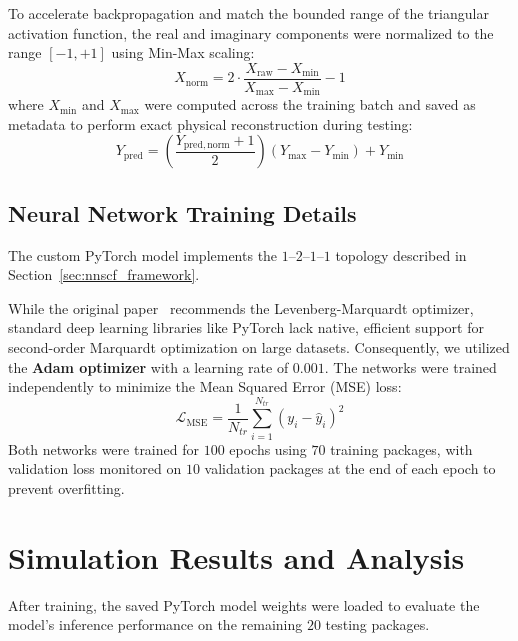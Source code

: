 To accelerate backpropagation and match the bounded range of the triangular activation function, the real and imaginary components were normalized to the range $[-1, +1]$ using Min-Max scaling:
\begin{equation*}
    X_{\mathrm{norm}} = 2 \cdot \frac{X_{\mathrm{raw}} - X_{\mathrm{min}}}{X_{\mathrm{max}} - X_{\mathrm{min}}} - 1
\end{equation*}
where $X_{\mathrm{min}}$ and $X_{\mathrm{max}}$ were computed across the training batch and saved as metadata to perform exact physical reconstruction during testing:
\begin{equation*}
    Y_{\mathrm{pred}} = \left(\frac{Y_{\mathrm{pred, norm}} + 1}{2}\right)(Y_{\mathrm{max}} - Y_{\mathrm{min}}) + Y_{\mathrm{min}}
\end{equation*}

\subsection{Neural Network Training Details}

The custom PyTorch model implements the $1\text{--}2\text{--}1\text{--}1$ topology described in Section~\ref{sec:nnscf_framework}.

While the original paper~\cite{sohn2015neural} recommends the Levenberg-Marquardt optimizer, standard deep learning libraries like PyTorch lack native, efficient support for second-order Marquardt optimization on large datasets. Consequently, we utilized the \textbf{Adam optimizer} with a learning rate of $0.001$. The networks were trained independently to minimize the Mean Squared Error (MSE) loss:
\begin{equation*}
    \mathcal{L}_{\mathrm{MSE}} = \frac{1}{N_{tr}} \sum_{i=1}^{N_{tr}} (y_i - \hat{y}_i)^2
\end{equation*}
Both networks were trained for $100$ epochs using $70$ training packages, with validation loss monitored on $10$ validation packages at the end of each epoch to prevent overfitting.

\section{Simulation Results and Analysis}
\label{sec:nnscf_results}

After training, the saved PyTorch model weights were loaded to evaluate the model's inference performance on the remaining $20$ testing packages.

